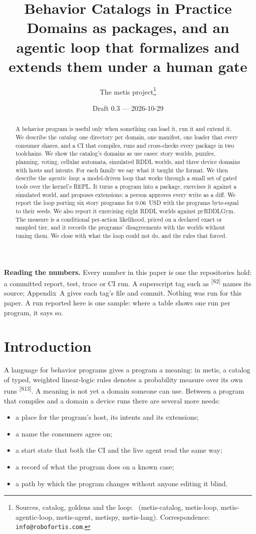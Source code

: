 \documentclass[11pt]{article}
\title{\textbf{Behavior Catalogs in Practice}\\[1ex]
\large Domains as packages, and an agentic loop that formalizes and
extends them under a human gate}
\author{The metis project\thanks{Sources, catalog, goldens and the loop:
\repourl\ (metis-catalog, metis-loop, metis-agentic-loop, metis-agent,
metispy, metis-lang). Correspondence: \texttt{info@robofortis.com}.}}
\date{Draft 0.3 --- 2026-10-29}
\newcommand{\src}[1]{\textsuperscript{[#1]}}
\begin{document}
\maketitle

\begingroup\small\noindent
\textbf{Reading the numbers.} Every number in this paper is one the
repositories hold: a committed report, test, trace or CI run. A
superscript tag such as \src{S2} names its source; Appendix~A gives each
tag's file and commit. Nothing was run for this paper. A run reported here
is one sample: where a table shows one run per program, it says so.
\par\endgroup

\begin{abstract}
A behavior program is useful only when something can load it, run it and
extend it. We describe the \emph{catalog}: one directory per domain, one
manifest, one loader that every consumer shares, and a CI that compiles,
runs and cross-checks every package in two toolchains. We show the
catalog's domains as use cases: story worlds, puzzles, planning, voting,
cellular automata, simulated RDDL worlds, and three device domains with
hosts and intents. For each family we say what it taught the format. We
then describe the \emph{agentic loop}: a model-driven loop that works
through a small set of gated tools over the kernel's REPL. It turns a
program into a package, exercises it against a simulated world, and
proposes extensions; a person approves every write as a diff. We report the
loop porting six story programs for 0.06~USD with the programs byte-equal
to their seeds. We also report it exercising eight RDDL worlds against
pyRDDLGym. The measure is a conditional per-action likelihood, priced on a
declared exact or sampled tier, and it records the programs' disagreements
with the worlds without tuning them. We close with what the loop could not
do, and the rules that forced.
\end{abstract}

\section{Introduction}\label{sec:intro}

A language for behavior programs gives a program a meaning: in metis, a
catalog of typed, weighted linear-logic rules denotes a probability
measure over its own runs \src{S13}. A meaning is not yet a domain someone
can use. Between a program that compiles and a domain a device runs there
are several more needs:
\begin{itemize}[nosep]
\item a place for the program's host, its intents and its extensions;
\item a name the consumers agree on;
\item a start state that both the CI and the live agent read the same way;
\item a record of what the program does on a known case;
\item a path by which the program changes without anyone editing it blind.
\end{itemize}
\end{document}
